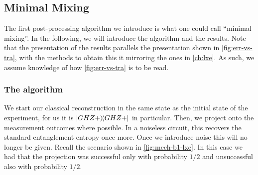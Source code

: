 
\subsection{Minimal Mixing}\label{sec:minimal-mixing}

The first post-processing algorithm we introduce is what one could call
\enquote{minimal mixing}. In the following, we will introduce the algorithm and
the results. Note that the presentation of the results parallels the
presentation shown in \cref{fig:err-vs-tra}, with the methods to obtain this
it mirroring the ones in \cref{ch:lxe}. As such, we assume knowledge of how
\cref{fig:err-vs-tra} is to be read.

\subsubsection{The algorithm}

We start our classical reconstruction in the same state as the initial state of
the experiment, for us it is $\dyad{GHZ+}$ in particular. Then, we project onto
the measurement outcomes where possible. In a noiseless circuit, this recovers
the standard entanglement entropy once more. Once we introduce noise this will
no longer be given. Recall the scenario shown in \cref{fig:mech-b1-lxe}. In
this case we had that the projection was successful only with probability $1
/2$ and unsuccessful also with probability $1 /2$.


